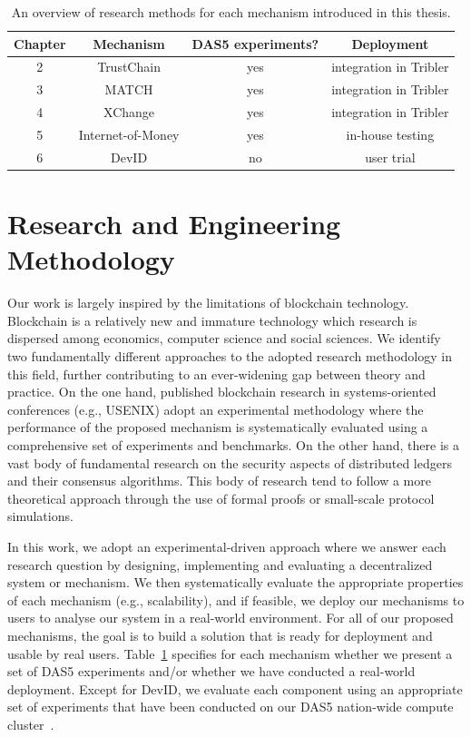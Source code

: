 \begin{table}[t]
	\small
	\centering
	\begin{tabular}{ |c|c|c|c| }
		\hline
		\textbf{Chapter} & \textbf{Mechanism} & \textbf{DAS5 experiments?} & \textbf{Deployment} \\ \hline
		2 & TrustChain & yes & integration in Tribler \\ \hline
		3 & MATCH & yes & integration in Tribler \\ \hline
		4 & XChange & yes & integration in Tribler \\ \hline
		5 & Internet-of-Money & yes & in-house testing \\ \hline
		6 & DevID & no & user trial \\ \hline
	\end{tabular}
	\caption{An overview of research methods for each mechanism introduced in this thesis.}
	\label{table:research_methodology}
\end{table}

\section{Research and Engineering Methodology}
Our work is largely inspired by the limitations of blockchain technology.
Blockchain is a relatively new and immature technology which research is dispersed among economics, computer science and social sciences.
We identify two fundamentally different approaches to the adopted research methodology in this field, further contributing to an ever-widening gap between theory and practice.
On the one hand, published blockchain research in systems-oriented conferences (e.g., USENIX) adopt an experimental methodology where the performance of the proposed mechanism is systematically evaluated using a comprehensive set of experiments and benchmarks.
On the other hand, there is a vast body of fundamental research on the security aspects of distributed ledgers and their consensus algorithms.
This body of research tend to follow a more theoretical approach through the use of formal proofs or small-scale protocol simulations.

In this work, we adopt an experimental-driven approach where we answer each research question by designing, implementing and evaluating a decentralized system or mechanism.
We then systematically evaluate the appropriate properties of each mechanism (e.g., scalability), and if feasible, we deploy our mechanisms to users to analyse our system in a real-world environment.
For all of our proposed mechanisms, the goal is to build a solution that is ready for deployment and usable by real users.
Table~\ref{table:research_methodology} specifies for each mechanism whether we present a set of DAS5 experiments and/or whether we have conducted a real-world deployment.
Except for DevID, we evaluate each component using an appropriate set of experiments that have been conducted on our DAS5 nation-wide compute cluster~\cite{bal2016medium}.


